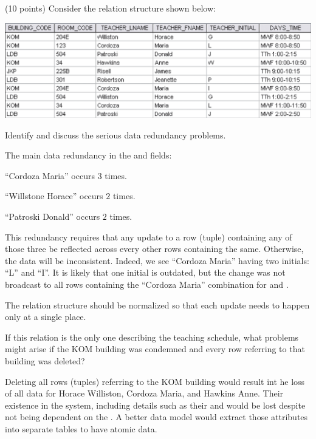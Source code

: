 

\begin{problem} (10 points)
  Consider the relation structure shown below:

  \bigskip

  \includegraphics[scale=0.8]{01.png}

  \begin{enumalph}
    \item Identify and discuss the serious data redundancy problems.
    \begin{Answer}
      The main data redundancy in the 
      and  fields:
      \begin{enumalph}
        \item ``Cordoza Maria'' occurs $3$ times.
        \item ``Willstone Horace'' occurs $2$ times.
        \item ``Patroski Donald'' occurs $2$ times.
      \end{enumalph}
	
      \bigskip
      This redundancy requires that any update to a row (tuple) containing
      any of those three be reflected across every other rows containing the same.
      Otherwise, the data will be inconsistent.
      Indeed, we see ``Cordoza Maria'' having two initials: ``L'' and ``I''.
      It is likely that one initial is outdated, but the change
      was not broadcast to all rows containing the ``Cordoza Maria'' combination
      for  and .

      The relation structure should be normalized so that
      each update needs to happen only at a single place.
    \end{Answer}
    \item  If this relation is the only one describing the teaching schedule,
    what problems might arise if the KOM building was condemned
    and every row referring to that building was deleted?
    \begin{Answer}

      Deleting all rows (tuples) referring to the KOM building
      would result int he loss of all data for
      Horace Williston, Cordoza Maria, and Hawkins Anne.
      Their existence in the system, including details such as their
       and  would be lost
      despite not being dependent on the .
      A better data model would extract those attributes into separate tables
      to have atomic data.
    \end{Answer}
  \end{enumalph}

\end{problem}
